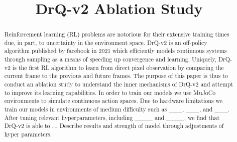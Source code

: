\documentclass[conference]{./IEEEtran/IEEEtran} %
\begin{document}
    \title{DrQ-v2 Ablation Study}

    \author{
        \and
        \and
    }

    \maketitle

    \begin{abstract}
Reinforcement learning (RL) problems are notorious for their extensive training times due, in part, to uncertainty in the environment space. DrQ-v2 is an off-policy algorithm published by facebook in 2021 which efficiently models continuous systems through sampling as a means of speeding up convergence and learning. Uniquely, DrQ-v2 is the first RL algorithm to learn from direct pixel observation by comparing the current frame to the previous and future frames.
The purpose of this paper is thus to conduct an ablation study to understand the inner mechanisms of DrQ-v2 and attempt to improve its learning capabilities. In order to train our models we use MuJoCo environments to simulate continuous action spaces. Due to hardware limitations we train our models in environments of medium difficulty such as ___, ___, and ___. After tuning relevant hyperparameters, including ____ and ____, we find that DrQ-v2 is able to …. Describe results and strength of model through adjustments of hyper parameters.


    \end{abstract}
\end{document}

